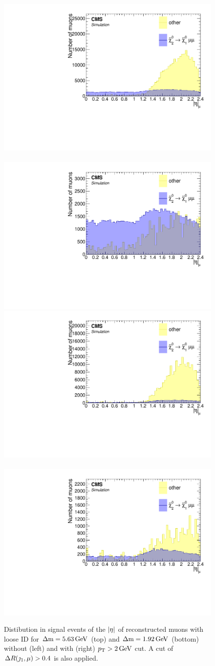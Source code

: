 \begin{figure}[!htb]
\centering
\includegraphics[width=0.48\linewidth]{plots/lepton_selection/lepton_selection_dm5p63/none_Muons_Eta.pdf} \,
\includegraphics[width=0.48\linewidth]{plots/lepton_selection/lepton_selection_dm5p63/none_Muons_Eta_after_pt.pdf} \\
\includegraphics[width=0.48\linewidth]{plots/lepton_selection/lepton_selection_dm1p92/none_Muons_Eta.pdf}  \,
\includegraphics[width=0.48\linewidth]{plots/lepton_selection/lepton_selection_dm1p92/none_Muons_Eta_after_pt.pdf} \\
\caption[Distibution in signal events of the $\abs{\eta}$ of reconstructed muons with loose ID before and after $\pt>2\GeV$ cut]{Distibution in signal events of the $\abs{\eta}$ of reconstructed muons with loose ID for $\Delta\mathrm{m}=5.63\,\text{Ge\hspace{-.08em}V}$ (top) and $\Delta\mathrm{m}=1.92\,\text{Ge\hspace{-.08em}V}$ (bottom) without (left) and with (right) $\pt>2\GeV$ cut. A cut of $\Delta R(\jmath_1,\mu)>0.4$ is also applied.}
\label{fig:muons-selection-eta}
\end{figure}

